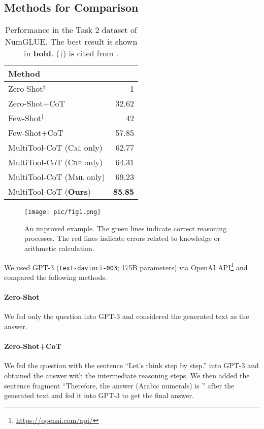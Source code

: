 \subsection{Methods for Comparison}

\begin{table}[t]
    \centering
    \begin{tabular}{lD{.}{.}{2}}
        \toprule
        Method & \\
        \midrule
        Zero-Shot$^{\dagger}$ & 1 \\
        Zero-Shot+CoT & 32.62 \\
        \midrule
        Few-Shot$^{\dagger}$  & 42 \\
        Few-Shot+CoT & 57.85 \\
        MultiTool-CoT (\textsc{Cal} only) & 62.77 \\
        MultiTool-CoT (\textsc{Crp} only) & 64.31 \\
        MultiTool-CoT (\textsc{Mml} only) & 69.23 \\
        MultiTool-CoT (\textbf{Ours}) & \textbf{85}.\textbf{85} \\
        \bottomrule
    \end{tabular}
    \caption{
    Performance in the Task 2 dataset of NumGLUE.
    The best result is shown in \textbf{bold}.
    ($\dagger$) is cited from \citet{mishra-etal-2022-numglue}.
    }    
    \label{tab:result}
\end{table}
\begin{figure*}[t]
    \centering
    \texttt{[image: pic/fig1.png]}
    \caption{
    An improved example.
    The green lines indicate correct reasoning processes.
    The red lines indicate errors related to knowledge or arithmetic calculation.
    }
    \label{fig:mis}
\end{figure*}

We used GPT-3 (\texttt{text-davinci-003}; 175B parameters) via OpenAI API\footnote{\url{https://openai.com/api/}} and compared the following methods.

\paragraph{Zero-Shot}
We fed only the question into GPT-3 and considered the generated text as the answer.

\paragraph{Zero-Shot+CoT~\cite{kojima2022large}}
We fed the question with the sentence ``Let's think step by step.'' into GPT-3 and obtained the answer with the intermediate reasoning steps.
We then added the sentence fragment ``Therefore, the answer (Arabic numerals) is '' after the generated text and fed it into GPT-3 to get the final answer.

